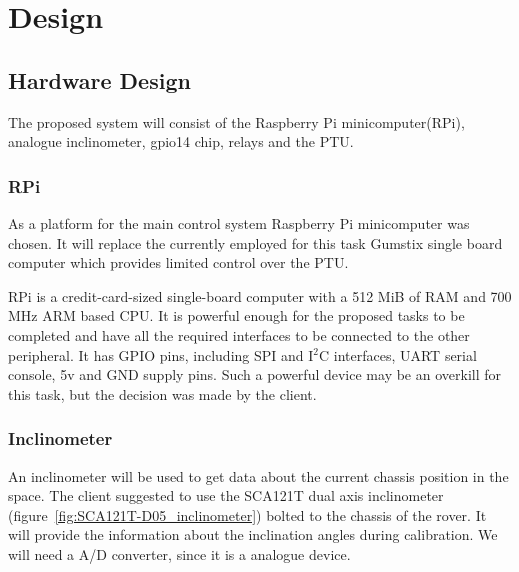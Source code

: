 \chapter{Design}

\section{Hardware Design}
The proposed system will consist of the Raspberry Pi minicomputer(RPi), analogue inclinometer, gpio14 chip, relays and the PTU.

\subsection{RPi}
As a platform for the main control system Raspberry Pi minicomputer was chosen. It will replace the currently employed for this task Gumstix single board computer which provides limited control over the PTU. 

RPi is a credit-card-sized single-board computer with a 512 MiB of RAM and 700 MHz ARM based CPU. It is powerful enough for the proposed tasks to be completed and have all the required interfaces to be connected to the other peripheral. It has GPIO pins, including SPI and I$^2$C interfaces, UART serial console, 5v and GND supply pins. Such a powerful device may be an overkill for this task, but the decision was made by the client.

\subsection{Inclinometer}
An inclinometer will be used to get data about the current chassis position in the space. The client suggested to use the SCA121T dual axis inclinometer (figure~\ref{fig:SCA121T-D05_inclinometer}) bolted to the chassis of the rover. It will provide the information about the inclination angles during calibration. We will need a A/D converter, since it is a analogue device.


